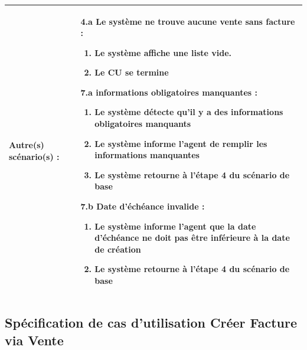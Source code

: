 \begin{longtable}{|>{\bfseries\raggedright\arraybackslash}p{3.5cm}|p{\dimexpr\textwidth-3.5cm-4\tabcolsep-2\arrayrulewidth}|}
\hline
Autre(s) scénario(s) : &
\textbf{4.a Le système ne trouve aucune vente sans facture :}
\begin{enumerate}[leftmargin=1.5em, topsep=2pt, itemsep=1pt]
  \item Le système affiche une liste vide.
  \item Le CU se termine
\end{enumerate}
\textbf{7.a informations obligatoires manquantes :}
\begin{enumerate}[leftmargin=1.5em, topsep=2pt, itemsep=1pt]
  \item Le système détecte qu'il y a des informations obligatoires manquants
  \item Le système informe l'agent de remplir les informations manquantes
  \item Le système retourne à l'étape 4 du scénario de base
\end{enumerate}
\textbf{7.b Date d'échéance invalide :}
\begin{enumerate}[leftmargin=1.5em, topsep=2pt, itemsep=1pt]
  \item Le système informe l'agent que la date d'échéance ne doit pas être inférieure à la date de création
  \item Le système retourne à l'étape 4 du scénario de base
\end{enumerate} \\
\hline
\end{longtable}

\newpage
\subsection{Spécification de cas d'utilisation Créer Facture via Vente}

